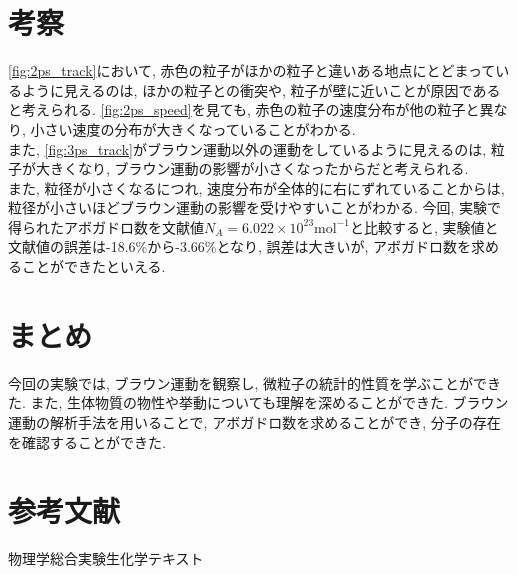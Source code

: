\documentclass[11pt]{ltjsarticle}
\begin{document}
  \section*{考察}
    \cref{fig:2ps_track}において, 赤色の粒子がほかの粒子と違いある地点にとどまっているように見えるのは, ほかの粒子との衝突や, 粒子が壁に近いことが原因であると考えられる.
    \cref{fig:2ps_speed}を見ても, 赤色の粒子の速度分布が他の粒子と異なり, 小さい速度の分布が大きくなっていることがわかる. \\
    また, \cref{fig:3ps_track}がブラウン運動以外の運動をしているように見えるのは, 粒子が大きくなり, ブラウン運動の影響が小さくなったからだと考えられる.\\
    また, 粒径が小さくなるにつれ, 速度分布が全体的に右にずれていることからは, 粒径が小さいほどブラウン運動の影響を受けやすいことがわかる. 
    今回, 実験で得られたアボガドロ数を文献値$N_A = 6.022 \times 10^{23} \mathrm{mol^{-1}}$と比較すると, 実験値と文献値の誤差は-18.6\%から-3.66\%となり, 誤差は大きいが, アボガドロ数を求めることができたといえる.
  \section*{まとめ}
    今回の実験では, ブラウン運動を観察し, 微粒子の統計的性質を学ぶことができた. また, 生体物質の物性や挙動についても理解を深めることができた. 
    ブラウン運動の解析手法を用いることで, アボガドロ数を求めることができ, 分子の存在を確認することができた. 
  \section*{参考文献}
    物理学総合実験生化学テキスト
\end{document}
